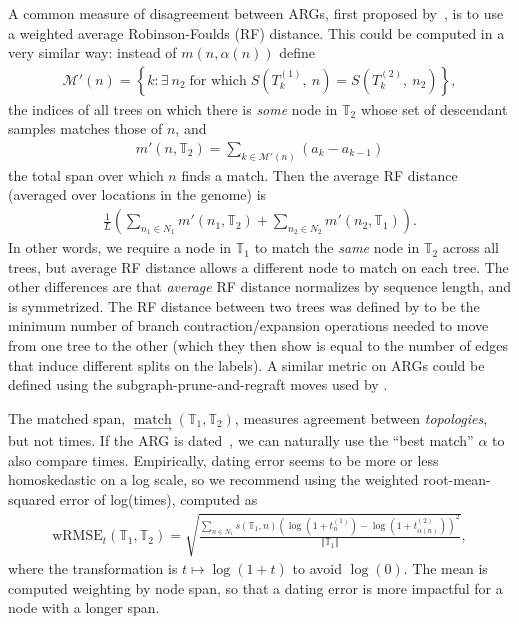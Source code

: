 \documentclass[10pt,twoside,lineno]{gsajnl}
\newcommand{\T}{\mathbb{T}}
\newcommand{\match}{\underset{\longrightarrow}{\operatorname{match}}}
\begin{document}
A common measure of disagreement between ARGs, 
first proposed by~\cite{kuhner2015assessing}, 
is to use a weighted average Robinson-Foulds (RF) distance.
This could be computed in a very similar way:
instead of $m(n, \alpha(n))$ define
\begin{align*}
    \mathcal{M}'(n) = \left\{ k : \exists\ n_2  \;\text{for which}\; S\left(T^{(1)}_k,\ n\right) = S\left(T^{(2)}_k,\ n_2\right) \right\},
\end{align*}
the indices of all trees on which there is \emph{some} node in $\T_2$
whose set of descendant samples matches those of $n$, and
\begin{align*}
    m'(n, \T_2) = \sum_{k \in \mathcal{M}'(n)} (a_k - a_{k-1})
\end{align*}
the total span over which $n$ finds a match.
Then the average RF distance (averaged over locations in the genome) 
is
\begin{align*}
    \frac{1}{L} \left( \sum_{n_1 \in N_1} m'(n_1, \T_2)  + \sum_{n_2 \in N_2} m'(n_2, \T_1) \right).
\end{align*}
In other words, we require a node in $\T_1$ to match the \emph{same} node in $\T_2$
across all trees, but average RF distance allows a different node to match
on each tree.
The other differences are that \emph{average} RF distance
normalizes by sequence length, and is symmetrized.
The RF distance between two trees
was defined by \citet{robinson1981comparison}
to be the minimum number of branch contraction/expansion operations needed to move
from one tree to the other
(which they then show is equal to the number of edges 
that induce different splits on the labels).
A similar metric on ARGs could be defined
using the subgraph-prune-and-regraft moves used by \citet{deng2024robust}.

The matched span, $\match(\T_1, \T_2)$, measures agreement between \emph{topologies},
but not times.
If the ARG is dated~\citep[e.g., as in][]{wohns2022unified,deng2024robust}, 
we can naturally use the ``best match'' $\alpha$
to also compare times.
Empirically, dating error seems to be more or less homoskedastic on a log scale,
so we recommend 
using the weighted root-mean-squared error of log(times), computed as
\begin{align}\label{eqn:wrmse}
    \text{wRMSE}_t(\T_1, \T_2)
    = \sqrt{\frac{
        \sum_{n \in N_1} s(\T_1,n) \left(\log\left(1+ t^{(1)}_n\right) - \log\left(1+ t^{(2)}_{\alpha(n)}\right) \right)^2 
    }{
        \Vert{\T_1}\Vert
    } } ,
\end{align}
where the transformation is $t \mapsto \log(1 + t)$ to avoid $\log(0)$.
The mean is computed weighting by node span, so that a dating error
is more impactful for a node with a longer span. 
\end{document}
